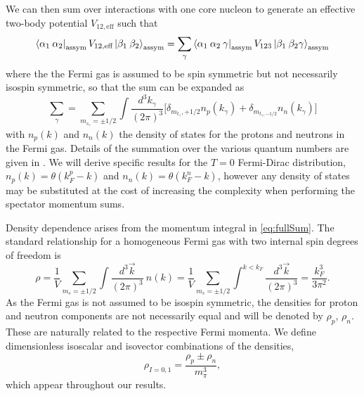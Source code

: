 We can then sum over interactions with one core nucleon to generate an effective two-body potential $V_{12,\text{eff}}$ such that
\begin{equation}
\bra{\alpha_1\:\alpha_2}_{\text{assym}}  V_{12,\text{eff}}\ket{\beta_1 \:\beta_2 }_{\text{assym}}= \sum_{\gamma} \bra{\alpha_1\:\alpha_2 \: \gamma}_{\text{assym}} V_{123}  \ket{\beta_1 \:\beta_2 \gamma}_{\text{assym}}
\end{equation}
where the the Fermi gas is assumed to be spin symmetric but not necessarily isospin symmetric, so that the sum can be expanded as
\begin{equation}\label{eq:fullSum}
\sum_\gamma=\sum_{m_{s_\gamma}=\pm 1/2}\int \frac{d^3k_\gamma}{(2\pi)^3} \Big[\delta_{m_{t_\gamma},+1/2} n_p(k_\gamma) +\delta_{m_{t_\gamma,-1/2}} n_n(k_\gamma) \Big]
\end{equation}
with $n_p(k)$ and $n_n(k)$ the density of states for the protons and neutrons in the Fermi gas. Details of the summation over the various quantum numbers are given in . We will derive specific results for the $T=0$ Fermi-Dirac distribution, $n_p(k)=\theta(k_{F}^{p}-k)$ and $n_n(k)=\theta(k_{F}^{n}-k)$, however any density of states may be substituted at the cost of increasing the complexity when performing the spectator momentum sums.

Density dependence arises from the momentum integral in \eqref{eq:fullSum}. The standard relationship for a homogeneous Fermi gas with two internal spin degrees of freedom is 
\begin{equation}\label{eq:kF}
\rho=\frac{1}{V}\sum_{m_{s}=\pm 1/2}\int \frac{d^3\vec{k}}{(2\pi)^3}\:n(k)
=\frac{1}{V}\sum_{m_{s}=\pm 1/2}\int^{k<k_F}\frac{d^3\vec{k}}{(2\pi)^3}=\frac{k_F^3}{3\pi^2}.
\end{equation}
As the Fermi gas is not assumed to be isospin symmetric, the densities for proton and neutron components are not necessarily equal and will be denoted by $\rho_p$, $\rho_n$. These are naturally related to the respective Fermi momenta. We define dimensionless isoscalar and isovector combinations of the densities, 
\begin{equation}\label{eq:densities}
\rho_{I=0,1}=\frac{\rho_p\pm\rho_n}{m_\pi^3},
\end{equation}
which appear throughout our results.

